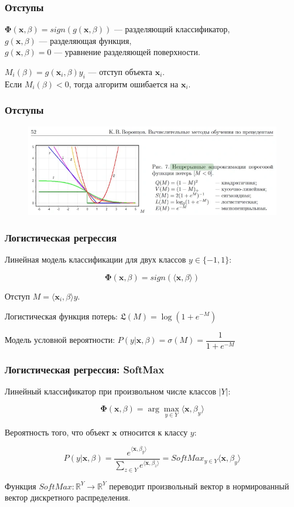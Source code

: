 \documentclass[11pt]{beamer}
\begin{document}
	\begin{frame}
		\frametitle{Отступы}
		
		$\bm{\Phi}(\bm{x}, \beta) = sign  (g(\bm{x}, \beta))$ --- разделяющий классификатор,\\
		$g(\bm{x}, \beta)$ --- разделяющая функция,\\
		$g(\bm{x}, \beta) = 0$ --- уравнение разделяющей поверхности.\\
		
		\bigskip
		
		$M_i(\beta) = g(\bm{x}_i, \beta) y_i$ --- отступ объекта $\bm{x}_i$. \\
		Если $M_i(\beta) < 0$, тогда алгоритм ошибается на $\bm{x}_i$.
	
	\end{frame}

	\begin{frame}
		\frametitle{Отступы}
		\begin{figure}
			\centering
			\includegraphics[width=0.7\linewidth]{imgs/margins}
			
			\label{fig:margins}
		\end{figure}
	\end{frame}

	\begin{frame}
	\frametitle{Логистическая регрессия}
	
			Линейная модель классификации для двух классов $y \in \{-1, 1\}$: 
			
			$$ \bm{\Phi}(\bm{x}, \beta) = sign  (\langle \bm{x}, \beta \rangle) $$
			
			Отступ $M = \langle \bm{x}_i, \beta \rangle y$.
			
			Логистическая функция потерь: $\mathfrak{L}(M) = \log (1 + e^{-M})$
			
			Модель условной вероятности: $ P(y| \bm{x}, \beta) = \sigma(M) = \dfrac{1}{1+e^{-M}}$ 
		
	\end{frame}

	\begin{frame}
		\frametitle{Логистическая регрессия: SoftMax}
		Линейный классификатор при произвольном числе классов $|Y|$:
		
		$$\bm{\Phi}(\bm{x}, \beta) = \arg \max\limits_{y \in Y} \langle \bm{x}, \beta_y \rangle $$
		
		Вероятность того, что объект $\bm{x}$ относится к классу $y$:
		
		$$ P(y| \bm{x}, \beta) = \dfrac{e^{\langle \bm{x}, \beta_y \rangle}}{\sum\limits_{z \in Y} e^{\langle \bm{x}, \beta_z \rangle}} = SoftMax_{y \in Y}\langle \bm{x}, \beta_y \rangle $$
		
		Функция $SoftMax: \mathbb{R}^Y \rightarrow \mathbb{R}^Y$ переводит произвольный вектор в нормированный вектор дискретного распределения.
	\end{frame}
\end{document}
